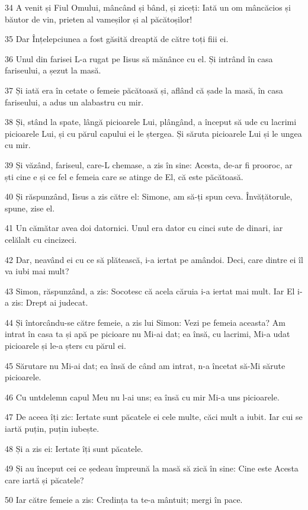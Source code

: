 \par 34 A venit și Fiul Omului, mâncând și bând, și ziceți: Iată un om mâncăcios și băutor de vin, prieten al vameșilor și al păcătoșilor!
\par 35 Dar Înțelepciunea a fost găsită dreaptă de către toți fiii ei.
\par 36 Unul din farisei L-a rugat pe Iisus să mănânce cu el. Și intrând în casa fariseului, a șezut la masă.
\par 37 Și iată era în cetate o femeie păcătoasă și, aflând că șade la masă, în casa fariseului, a adus un alabastru cu mir.
\par 38 Și, stând la spate, lângă picioarele Lui, plângând, a început să ude cu lacrimi picioarele Lui, și cu părul capului ei le ștergea. Și săruta picioarele Lui și le ungea cu mir.
\par 39 Și văzând, fariseul, care-L chemase, a zis în sine: Acesta, de-ar fi prooroc, ar ști cine e și ce fel e femeia care se atinge de El, că este păcătoasă.
\par 40 Și răspunzând, Iisus a zis către el: Simone, am să-ți spun ceva. Învățătorule, spune, zise el.
\par 41 Un cămătar avea doi datornici. Unul era dator cu cinci sute de dinari, iar celălalt cu cincizeci.
\par 42 Dar, neavând ei cu ce să plătească, i-a iertat pe amândoi. Deci, care dintre ei îl va iubi mai mult?
\par 43 Simon, răspunzând, a zis: Socotesc că acela căruia i-a iertat mai mult. Iar El i-a zis: Drept ai judecat.
\par 44 Și întorcându-se către femeie, a zis lui Simon: Vezi pe femeia aceasta? Am intrat în casa ta și apă pe picioare nu Mi-ai dat; ea însă, cu lacrimi, Mi-a udat picioarele și le-a șters cu părul ei.
\par 45 Sărutare nu Mi-ai dat; ea însă de când am intrat, n-a încetat să-Mi sărute picioarele.
\par 46 Cu untdelemn capul Meu nu l-ai uns; ea însă cu mir Mi-a uns picioarele.
\par 47 De aceea îți zic: Iertate sunt păcatele ei cele multe, căci mult a iubit. Iar cui se iartă puțin, puțin iubește.
\par 48 Și a zis ei: Iertate îți sunt păcatele.
\par 49 Și au început cei ce ședeau împreună la masă să zică în sine: Cine este Acesta care iartă și păcatele?
\par 50 Iar către femeie a zis: Credința ta te-a mântuit; mergi în pace.

